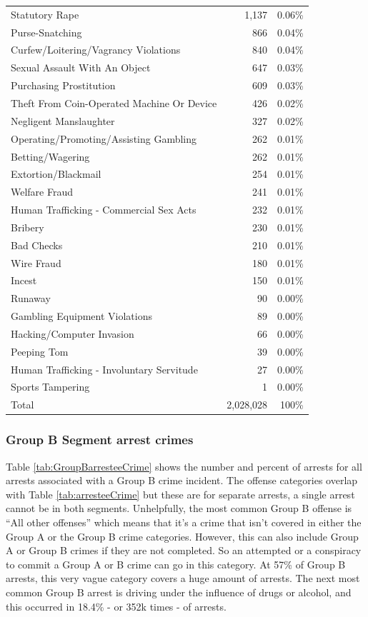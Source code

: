 \documentclass[
  12pt,
  openany]{book}
\begin{document}
\begin{longtable}[]{@{}lrr@{}}
Statutory Rape & 1,137 & 0.06\%\tabularnewline
Purse-Snatching & 866 & 0.04\%\tabularnewline
Curfew/Loitering/Vagrancy Violations & 840 & 0.04\%\tabularnewline
Sexual Assault With An Object & 647 & 0.03\%\tabularnewline
Purchasing Prostitution & 609 & 0.03\%\tabularnewline
Theft From Coin-Operated Machine Or Device & 426 & 0.02\%\tabularnewline
Negligent Manslaughter & 327 & 0.02\%\tabularnewline
Operating/Promoting/Assisting Gambling & 262 & 0.01\%\tabularnewline
Betting/Wagering & 262 & 0.01\%\tabularnewline
Extortion/Blackmail & 254 & 0.01\%\tabularnewline
Welfare Fraud & 241 & 0.01\%\tabularnewline
Human Trafficking - Commercial Sex Acts & 232 & 0.01\%\tabularnewline
Bribery & 230 & 0.01\%\tabularnewline
Bad Checks & 210 & 0.01\%\tabularnewline
Wire Fraud & 180 & 0.01\%\tabularnewline
Incest & 150 & 0.01\%\tabularnewline
Runaway & 90 & 0.00\%\tabularnewline
Gambling Equipment Violations & 89 & 0.00\%\tabularnewline
Hacking/Computer Invasion & 66 & 0.00\%\tabularnewline
Peeping Tom & 39 & 0.00\%\tabularnewline
Human Trafficking - Involuntary Servitude & 27 & 0.00\%\tabularnewline
Sports Tampering & 1 & 0.00\%\tabularnewline
Total & 2,028,028 & 100\%\tabularnewline
\bottomrule
\end{longtable}

\hypertarget{group-b-segment-arrest-crimes}{%
\subsubsection{Group B Segment arrest crimes}\label{group-b-segment-arrest-crimes}}

Table \ref{tab:GroupBarresteeCrime} shows the number and percent of arrests for all arrests associated with a Group B crime incident. The offense categories overlap with Table \ref{tab:arresteeCrime} but these are for separate arrests, a single arrest cannot be in both segments. Unhelpfully, the most common Group B offense is ``All other offenses'' which means that it's a crime that isn't covered in either the Group A or the Group B crime categories. However, this can also include Group A or Group B crimes if they are not completed. So an attempted or a conspiracy to commit a Group A or B crime can go in this category. At 57\% of Group B arrests, this very vague category covers a huge amount of arrests. The next most common Group B arrest is driving under the influence of drugs or alcohol, and this occurred in 18.4\% - or 352k times - of arrests.
\end{document}
